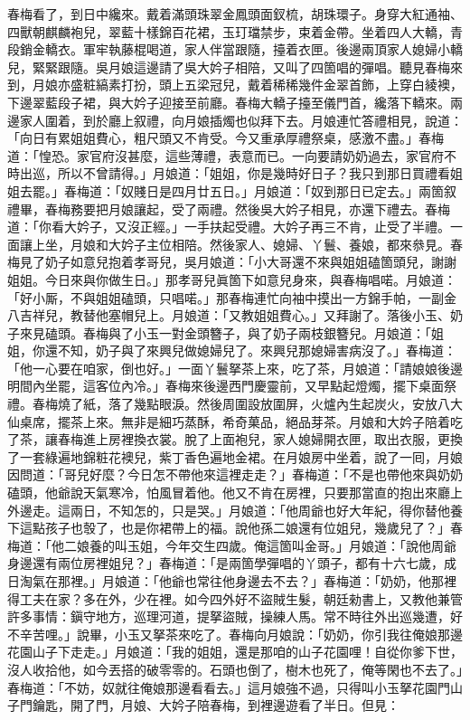 春梅看了，到日中纔來。戴着滿頭珠翠金鳳頭面釵梳，胡珠環子。身穿大紅通袖、四獸朝麒麟袍兒，翠藍十樣錦百花裙，玉玎璫禁步，束着金帶。坐着四人大轎，青段銷金轎衣。軍牢執藤棍喝道，家人伴當跟隨，擡着衣匣。後邊兩頂家人媳婦小轎兒，緊緊跟隨。{}吳月娘這邊請了吳大妗子相陪，又叫了四箇唱的彈唱。聽見春梅來到，月娘亦盛粧縞素打扮，頭上五梁冠兒，戴着稀稀幾件金翠首飾，{}上穿白綾襖，下邊翠藍段子裙，與大妗子迎接至前廳。春梅大轎子擡至儀門首，纔落下轎來。兩邊家人圍着，到於廳上叙禮，向月娘插燭也似拜下去。月娘連忙答禮相見，說道：「向日有累姐姐費心，粗尺頭又不肯受。今又重承厚禮祭桌，感激不盡。」春梅道：「惶恐。家官府沒甚麼，這些薄禮，表意而已。一向要請奶奶過去，家官府不時出巡，所以不曾請得。」月娘道：「姐姐，你是幾時好日子？我只到那日買禮看姐姐去罷。」{}春梅道：「奴賤日是四月廿五日。」月娘道：「奴到那日已定去。」兩箇叙禮畢，春梅務要把月娘讓起，受了兩禮。然後吳大妗子相見，亦還下禮去。春梅道：「你看大妗子，又沒正經。」一手扶起受禮。大妗子再三不肯，止受了半禮。一面讓上坐，月娘和大妗子主位相陪。然後家人、媳婦、丫鬟、養娘，都來叅見。春梅見了奶子如意兒抱着孝哥兒，吳月娘道：「小大哥還不來與姐姐磕箇頭兒，謝謝姐姐。今日來與你做生日。」那孝哥兒眞箇下如意兒身來，與春梅唱喏。月娘道：「好小厮，不與姐姐磕頭，只唱喏。」那春梅連忙向袖中摸出一方錦手帕，一副金八吉祥兒，教替他塞帽兒上。月娘道：「又教姐姐費心。」又拜謝了。落後小玉、奶子來見磕頭。春梅與了小玉一對金頭簪子，{}與了奶子兩枝銀簪兒。月娘道：「姐姐，你還不知，奶子與了來興兒做媳婦兒了。來興兒那媳婦害病沒了。」春梅道：「他一心要在咱家，倒也好。」{}一面丫鬟拏茶上來，吃了茶，月娘道：「請娘娘後邊明間內坐罷，這客位內冷。」春梅來後邊西門慶靈前，又早點起燈燭，擺下桌面祭禮。春梅燒了紙，落了幾點眼淚。{}然後周圍設放圍屏，火爐內生起炭火，安放八大仙桌席，擺茶上來。無非是細巧蒸酥，希奇菓品，絕品芽茶。月娘和大妗子陪着吃了茶，讓春梅進上房裡換衣裳。脫了上面袍兒，家人媳婦開衣匣，取出衣服，更換了一套綠遍地錦粧花襖兒，紫丁香色遍地金裙。在月娘房中坐着，說了一囘，月娘因問道：「哥兒好麼？今日怎不帶他來這裡走走？」春梅道：「不是也帶他來與奶奶磕頭，他爺說天氣寒冷，怕風冒着他。他又不肯在房裡，只要那當直的抱出來廳上外邊走。{}這兩日，不知怎的，只是哭。」月娘道：「他周爺也好大年紀，得你替他養下這點孩子也彀了，也是你裙帶上的福。說他孫二娘還有位姐兒，幾歲兒了？」春梅道：「他二娘養的叫玉姐，今年交生四歲。俺這箇叫金哥。」月娘道：「說他周爺身邊還有兩位房裡姐兒？」春梅道：「是兩箇學彈唱的丫頭子，都有十六七歲，成日淘氣在那裡。」月娘道：「他爺也常往他身邊去不去？」{}春梅道：「奶奶，他那裡得工夫在家？多在外，少在裡。如今四外好不盜賊生髮，朝廷勑書上，又教他兼管許多事情：鎭守地方，巡理河道，提拏盜賊，操練人馬。常不時往外出巡幾遭，好不辛苦哩。」說畢，小玉又拏茶來吃了。春梅向月娘說：「奶奶，你引我往俺娘那邊花園山子下走走。」月娘道：「我的姐姐，還是那咱的山子花園哩！自從你爹下世，沒人收拾他，如今丟搭的破零零的。石頭也倒了，樹木也死了，俺等閑也不去了。」春梅道：「不妨，奴就往俺娘那邊看看去。」這月娘強不過，只得叫小玉拏花園門山子門鑰匙，開了門，月娘、大妗子陪春梅，到裡邊遊看了半日。但見：

